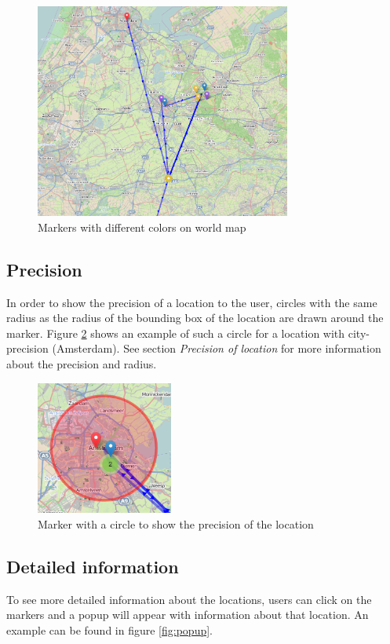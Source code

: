 \documentclass[twoside,openright,notitlepage]{uva-bachelor-thesis}
\begin{document}
\begin{figure}[h!]
    \centering
    \includegraphics[width=0.75\textwidth, center]{img/markers.png}
    \caption{Markers with different colors on world map}
    \label{fig:markers}
\end{figure}

\FloatBarrier
\subsection{Precision}
In order to show the precision of a location to the user, circles with the same radius as the radius of the bounding box of the location are drawn around the marker. Figure \ref{fig:radius} shows an example of such a circle for a location with city-precision (Amsterdam). See section \emph{Precision of location} for more information about the precision and radius.

\begin{figure}[h!]
    \centering
    \includegraphics[width=0.4\textwidth, center]{img/radius.png}
    \caption{Marker with a circle to show the precision of the location}
    \label{fig:radius}
\end{figure}

\FloatBarrier
\subsection{Detailed information}
To see more detailed information about the locations, users can click on the markers and a popup will appear with information about that location. An example can be found in figure \ref{fig:popup}.
\end{document}
